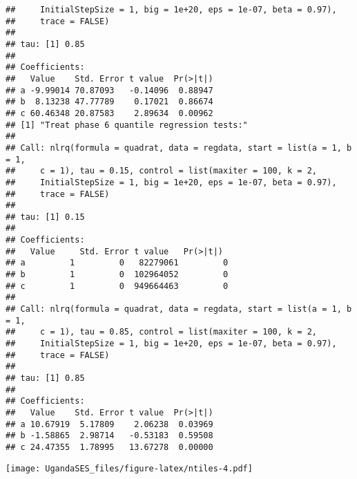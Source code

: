 \documentclass[
]{article}
\begin{document}
\begin{verbatim}
##     InitialStepSize = 1, big = 1e+20, eps = 1e-07, beta = 0.97), 
##     trace = FALSE)
## 
## tau: [1] 0.85
## 
## Coefficients:
##   Value    Std. Error t value  Pr(>|t|)
## a -9.99014 70.87093   -0.14096  0.88947
## b  8.13238 47.77789    0.17021  0.86674
## c 60.46348 20.87583    2.89634  0.00962
## [1] "Treat phase 6 quantile regression tests:"
## 
## Call: nlrq(formula = quadrat, data = regdata, start = list(a = 1, b = 1, 
##     c = 1), tau = 0.15, control = list(maxiter = 100, k = 2, 
##     InitialStepSize = 1, big = 1e+20, eps = 1e-07, beta = 0.97), 
##     trace = FALSE)
## 
## tau: [1] 0.15
## 
## Coefficients:
##   Value     Std. Error t value   Pr(>|t|) 
## a         1         0   82279061         0
## b         1         0  102964052         0
## c         1         0  949664463         0
## 
## Call: nlrq(formula = quadrat, data = regdata, start = list(a = 1, b = 1, 
##     c = 1), tau = 0.85, control = list(maxiter = 100, k = 2, 
##     InitialStepSize = 1, big = 1e+20, eps = 1e-07, beta = 0.97), 
##     trace = FALSE)
## 
## tau: [1] 0.85
## 
## Coefficients:
##   Value    Std. Error t value  Pr(>|t|)
## a 10.67919  5.17809    2.06238  0.03969
## b -1.58865  2.98714   -0.53183  0.59508
## c 24.47355  1.78995   13.67278  0.00000
\end{verbatim}

\texttt{[image: UgandaSES\_files/figure-latex/ntiles-4.pdf]}
\end{document}
